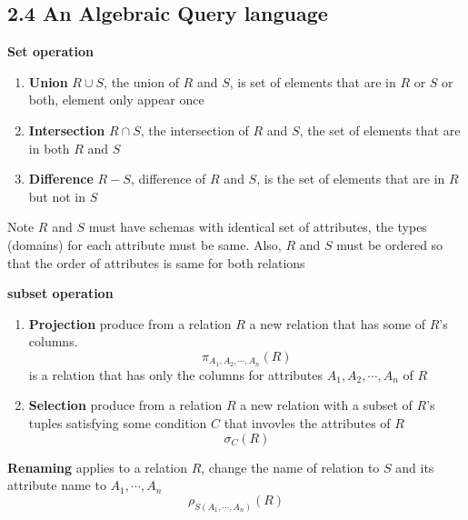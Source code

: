 \documentclass[11pt]{article}
\begin{document}
\subsection{2.4 An Algebraic Query language}

\begin{defn*}
    \textbf{Set operation} 
    \begin{enumerate}
        \item \textbf{Union} $R\cup S$, the union of $R$ and $S$, is set of elements that are in $R$ or $S$ or both, element only appear once 
        \item \textbf{Intersection} $R\cap S$, the intersection of $R$ and $S$, the set of elements that are in both $R$ and $S$
        \item \textbf{Difference} $R - S$, difference of $R$ and $S$, is the set of elements that are in $R$ but not in $S$
    \end{enumerate}
    Note $R$ and $S$ must have schemas with identical set of attributes, the types (domains) for each attribute must be same. Also, $R$ and $S$ must be ordered so that the order of attributes is same for both relations
\end{defn*}


\begin{defn*}
    \textbf{subset operation}
    \begin{enumerate}
        \item \textbf{Projection} produce from a relation $R$ a new relation that has some of $R$'s columns. 
        \[
            \pi_{A_1, A_2, \cdots, A_n}(R)
        \] 
        is a relation that has only the columns for attributes $A_1, A_2, \cdots, A_n$ of $R$\\
        \item \textbf{Selection} produce from a relation $R$ a new relation with a subset of $R$'s tuples satisfying some condition $C$ that invovles the attributes of $R$
        \[
            \sigma_{C}(R)
        \]
    \end{enumerate}
\end{defn*}


\begin{defn*}
    \textbf{Renaming} applies to a relation $R$, change the name of relation to $S$ and its attribute name to $A_1, \cdots, A_n$
    \[
        \rho_{S(A_1, \cdots, A_n)}(R)
    \]
\end{defn*}
\end{document}
